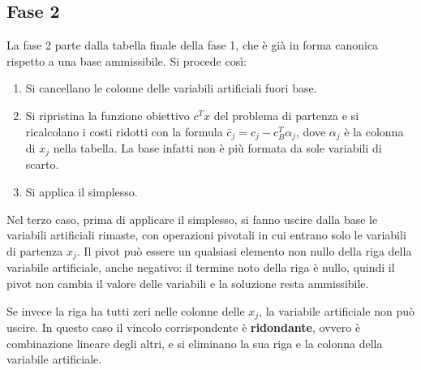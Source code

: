 \subsection{Fase 2}
La fase 2 parte dalla tabella finale della fase 1, che è già in forma canonica rispetto a una base ammissibile. Si procede così:
\begin{enumerate}
    \item Si cancellano le colonne delle variabili artificiali fuori base.
    \item Si ripristina la funzione obiettivo $c^T x$ del problema di partenza e si ricalcolano i costi ridotti con la formula $\bar{c}_j = c_j - c_B^T \alpha_j$, dove $\alpha_j$ è la colonna di $x_j$ nella tabella. La base infatti non è più formata da sole variabili di scarto.
    \item Si applica il simplesso.
\end{enumerate}

Nel terzo caso, prima di applicare il simplesso, si fanno uscire dalla base le variabili artificiali rimaste, con operazioni pivotali in cui entrano solo le variabili di partenza $x_j$. Il pivot può essere un qualsiasi elemento non nullo della riga della variabile artificiale, anche negativo: il termine noto della riga è nullo, quindi il pivot non cambia il valore delle variabili e la soluzione resta ammissibile.

Se invece la riga ha tutti zeri nelle colonne delle $x_j$, la variabile artificiale non può uscire. In questo caso il vincolo corrispondente è \textbf{ridondante}, ovvero è combinazione lineare degli altri, e si eliminano la sua riga e la colonna della variabile artificiale.

